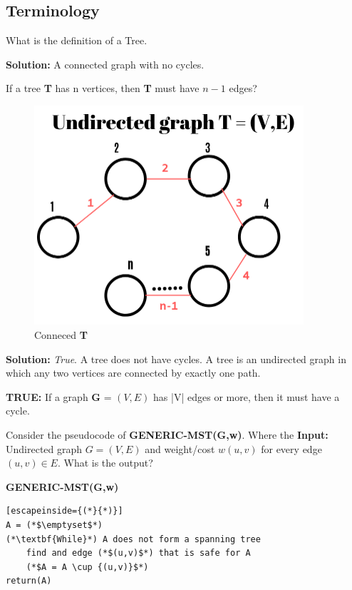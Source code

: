 \documentclass[11pt,fleqn]{book}
\begin{document}
\subsection{Terminology}
\begin{example}
What is the definition of a Tree. 
\end{example}
\textbf{Solution:} 
A connected graph with no cycles.
\vspace{1em}
\begin{example}
If a tree \textbf{T} has n vertices, then \textbf{T} must have $n - 1$ edges? 
\end{example}
\begin{figure}[H]
    \centering
    \includegraphics[width=100mm]{Pictures/treeT.png}
    \caption{Conneced  \textbf{T}}
    \label{fig:my_label}
\end{figure}
\textbf{Solution:} \textit{True}. A tree does not have cycles. A tree is an undirected graph in which any two vertices are connected by exactly one path.
\begin{remark}
\textbf{TRUE:} If a graph \textbf{G} = $(V,E)$ has |V| edges or more, then it must have a cycle. 
\end{remark}
\vspace{1em}
\begin{example}
Consider the pseudocode of \textbf{GENERIC-MST(G,w)}. Where the \textbf{Input:} Undirected graph $G = (V,E)$ and weight/cost $w(u,v)$ for every edge $(u,v)\in E$. What is the output? 
\end{example}
\textbf{GENERIC-MST(G,w)}
\begin{lstlisting}[escapeinside={(*}{*)}]
A = (*$\emptyset$*)
(*\textbf{While}*) A does not form a spanning tree
    find and edge (*$(u,v)$*) that is safe for A 
    (*$A = A \cup {(u,v)}$*)
return(A)
\end{lstlisting}
\end{document}
